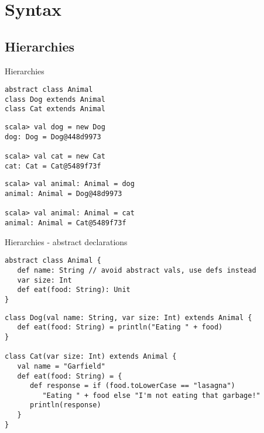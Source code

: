 \section{Syntax}
\subsection{Hierarchies}
\begin{frame}[fragile]{Hierarchies}
\begin{lstlisting}
abstract class Animal
class Dog extends Animal
class Cat extends Animal
\end{lstlisting}

\begin{lstlisting}
scala> val dog = new Dog
dog: Dog = Dog@448d9973

scala> val cat = new Cat
cat: Cat = Cat@5489f73f
\end{lstlisting}

\begin{lstlisting}
scala> val animal: Animal = dog
animal: Animal = Dog@48d9973

scala> val animal: Animal = cat
animal: Animal = Cat@5489f73f
\end{lstlisting}
\end{frame}

\begin{frame}[fragile]{Hierarchies - abstract declarations}
\begin{lstlisting}
abstract class Animal {
   def name: String // avoid abstract vals, use defs instead
   var size: Int
   def eat(food: String): Unit
}
\end{lstlisting}

\begin{lstlisting}
class Dog(val name: String, var size: Int) extends Animal {
   def eat(food: String) = println("Eating " + food)
}

class Cat(var size: Int) extends Animal {
   val name = "Garfield"
   def eat(food: String) = {
      def response = if (food.toLowerCase == "lasagna")
         "Eating " + food else "I'm not eating that garbage!"     
      println(response)
   }
}
\end{lstlisting}
\end{frame}

